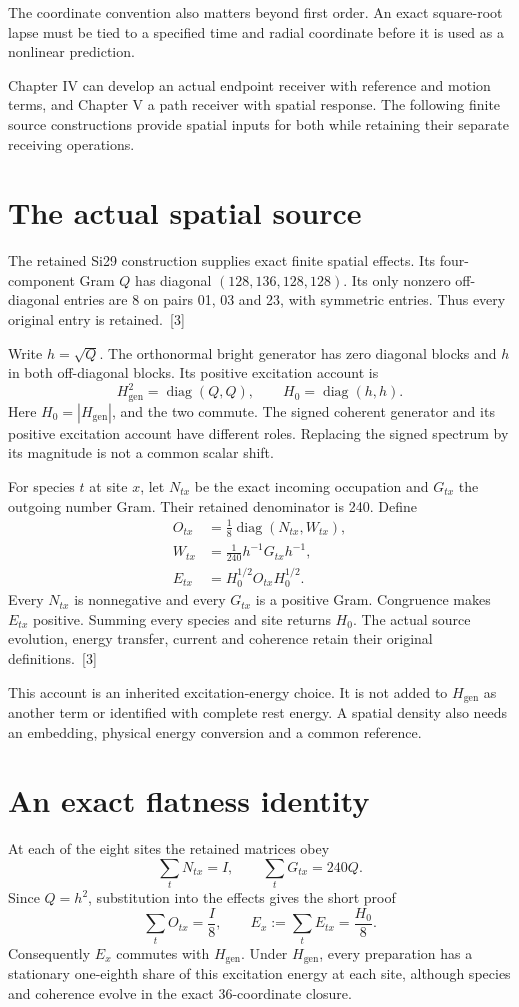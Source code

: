 \documentclass[10pt,twocolumn,letterpaper]{article}
\begin{document}
The coordinate convention also matters beyond first order. An exact square-root lapse must be tied to a specified time and radial coordinate before it is used as a nonlinear prediction.

Chapter IV can develop an actual endpoint receiver with reference and motion terms, and Chapter V a path receiver with spatial response. The following finite source constructions provide spatial inputs for both while retaining their separate receiving operations.

\section{The actual spatial source}
The retained Si29 construction supplies exact finite spatial effects. Its four-component Gram $Q$ has diagonal $(128,136,128,128)$. Its only nonzero off-diagonal entries are 8 on pairs 01, 03 and 23, with symmetric entries. Thus every original entry is retained.~[3]

Write $h=\sqrt Q$. The orthonormal bright generator has zero diagonal blocks and $h$ in both off-diagonal blocks. Its positive excitation account is
\[
H_{\mathrm{gen}}^2=\operatorname{diag}(Q,Q),\qquad H_0=\operatorname{diag}(h,h).
\]
Here $H_0=|H_{\mathrm{gen}}|$, and the two commute. The signed coherent generator and its positive excitation account have different roles. Replacing the signed spectrum by its magnitude is not a common scalar shift.

For species $t$ at site $x$, let $N_{tx}$ be the exact incoming occupation and $G_{tx}$ the outgoing number Gram. Their retained denominator is 240. Define
\[
\begin{aligned}
O_{tx}&=\frac18\operatorname{diag}(N_{tx},W_{tx}),\\
W_{tx}&=\frac{1}{240}h^{-1}G_{tx}h^{-1},\\
E_{tx}&=H_0^{1/2}O_{tx}H_0^{1/2}.
\end{aligned}
\]
Every $N_{tx}$ is nonnegative and every $G_{tx}$ is a positive Gram. Congruence makes $E_{tx}$ positive. Summing every species and site returns $H_0$. The actual source evolution, energy transfer, current and coherence retain their original definitions.~[3]

This account is an inherited excitation-energy choice. It is not added to $H_{\mathrm{gen}}$ as another term or identified with complete rest energy. A spatial density also needs an embedding, physical energy conversion and a common reference.

\section{An exact flatness identity}
At each of the eight sites the retained matrices obey
\[
\sum_tN_{tx}=I,\qquad\sum_tG_{tx}=240Q.
\]
Since $Q=h^2$, substitution into the effects gives the short proof
\[
\sum_tO_{tx}=\frac I8,\qquad E_x:=\sum_tE_{tx}=\frac{H_0}{8}.
\]
Consequently $E_x$ commutes with $H_{\mathrm{gen}}$. Under $H_{\mathrm{gen}}$, every preparation has a stationary one-eighth share of this excitation energy at each site, although species and coherence evolve in the exact 36-coordinate closure.
\end{document}
